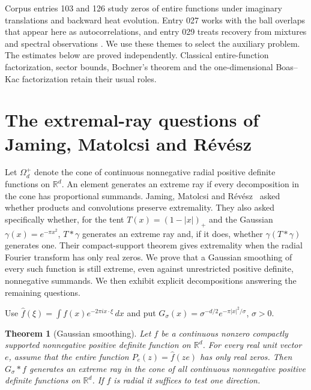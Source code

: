 \documentclass[11pt,a4paper]{article}
\newtheorem{theorem}{Theorem}[section]\newtheorem{lemma}[theorem]{Lemma}\newtheorem{proposition}[theorem]{Proposition}\newtheorem{corollary}[theorem]{Corollary}
\numberwithin{equation}{section}
\begin{document}
Corpus entries 103 and 126 study zeros of entire functions under imaginary translations and backward heat evolution. Entry 027 works with the ball overlaps that appear here as autocorrelations, and entry 029 treats recovery from mixtures and spectral observations \cite{Corpus}. We use these themes to select the auxiliary problem. The estimates below are proved independently. Classical entire-function factorization, sector bounds, Bochner's theorem and the one-dimensional Boas--Kac factorization retain their usual roles.

\section{The extremal-ray questions of Jaming, Matolcsi and R\'ev\'esz}
\label{sec:jmr}
Let $\Omega_d^+$ denote the cone of continuous nonnegative radial positive
definite functions on $\mathbb R^d$. An element generates an extreme ray
if every decomposition in the cone has proportional summands.
Jaming, Matolcsi and R\'ev\'esz~\cite[Questions 1 and 3]{JMR2009}
asked whether products and convolutions preserve extremality. They also
asked specifically whether, for the tent $T(x)=(1-|x|)_+$ and the Gaussian
$\gamma(x)=e^{-\pi x^2}$, $T*\gamma$ generates an extreme ray and, if it
does, whether $\gamma(T*\gamma)$ generates one. Their compact-support
theorem gives extremality when the radial Fourier transform has only real
zeros. We prove that a Gaussian smoothing of every such function is still
extreme, even against unrestricted positive definite, nonnegative
summands. We then exhibit explicit decompositions answering the remaining
questions.

Use $\widehat f(\xi)=\int f(x)e^{-2\pi i x\cdot\xi}\,dx$ and put
$G_\sigma(x)=\sigma^{-d/2}e^{-\pi|x|^2/\sigma}$, $\sigma>0$.
\begin{theorem}[Gaussian smoothing]\label{thm:smoothing}
Let $f$ be a continuous nonzero compactly supported nonnegative positive
definite function on $\mathbb R^d$. For every real unit vector $e$, assume
that the entire function $P_e(z)=\widehat f(ze)$ has only real zeros.
Then $G_\sigma*f$ generates an extreme ray in the cone of all continuous
nonnegative positive definite functions on $\mathbb R^d$. If $f$ is
radial it suffices to test one direction.
\end{theorem}
\end{document}
